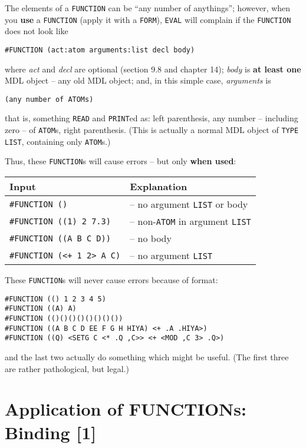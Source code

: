 \documentclass[a4paper]{scrbook}
\begin{document}
The elements of a \texttt{FUNCTION} can be ``any number of anythings''; however, when you \textbf{use} a \texttt{FUNCTION}
(apply it with a \texttt{FORM}), \texttt{EVAL} will complain if the \texttt{FUNCTION} does not look like

\begin{verbatim}
#FUNCTION (act:atom arguments:list decl body)
\end{verbatim}

where \emph{act} and \emph{decl} are optional (section 9.8 and chapter 14); \emph{body} is \textbf{at least one} MDL object
-- any old MDL object; and, in this simple case, \emph{arguments} is

\begin{verbatim}
(any number of ATOMs)
\end{verbatim}

that is, something \texttt{READ} and \texttt{PRINT}ed as: left parenthesis, any number -- including zero -- of
\texttt{ATOM}s, right parenthesis. (This is actually a normal MDL object of \texttt{TYPE} \texttt{LIST}, containing only
\texttt{ATOM}s.)

Thus, these \texttt{FUNCTION}s will cause errors -- but only \textbf{when used}:

\begin{longtable}[]{@{}ll@{}}
\toprule
Input & Explanation\tabularnewline
\midrule
\endhead
\texttt{\#FUNCTION\ ()} & -- no argument \texttt{LIST} or body\tabularnewline
\texttt{\#FUNCTION\ ((1)\ 2\ 7.3)} & -- non-\texttt{ATOM} in argument \texttt{LIST}\tabularnewline
\texttt{\#FUNCTION\ ((A\ B\ C\ D))} & -- no body\tabularnewline
\texttt{\#FUNCTION\ (\textless{}+\ 1\ 2\textgreater{}\ A\ C)} & -- no argument \texttt{LIST}\tabularnewline
\bottomrule
\end{longtable}

These \texttt{FUNCTION}s will never cause errors because of format:

\begin{verbatim}
#FUNCTION (() 1 2 3 4 5)
#FUNCTION ((A) A)
#FUNCTION (()()()()()()()())
#FUNCTION ((A B C D EE F G H HIYA) <+ .A .HIYA>)
#FUNCTION ((Q) <SETG C <* .Q ,C>> <+ <MOD ,C 3> .Q>)
\end{verbatim}

and the last two actually do something which might be useful. (The first three are rather pathological, but legal.)

\section{Application of FUNCTIONs: Binding {[}1{]}}\label{application-of-functions-binding-1}
\end{document}
